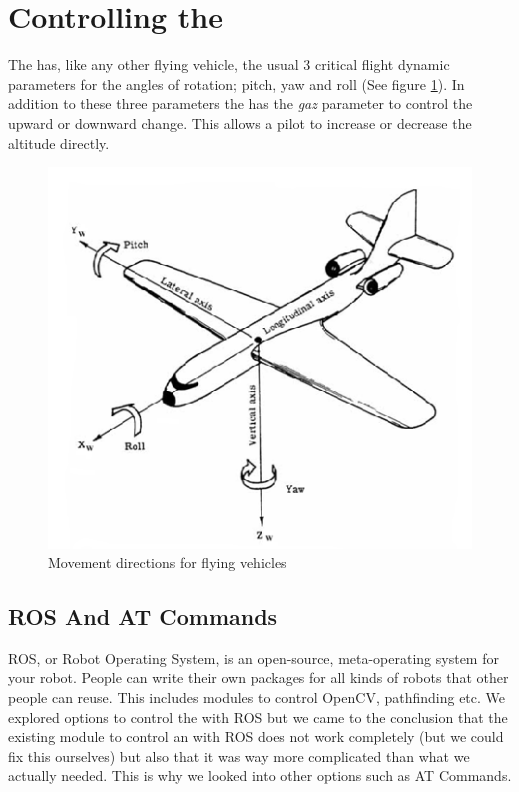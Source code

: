 \section{Controlling the \Ardrone}
The \Ardrone has, like any other flying vehicle, the usual 3 critical flight dynamic parameters for the angles of rotation; pitch, yaw and roll (See figure 
\ref{pitchYawRoll}). In addition to these three parameters the \Ardrone has the \textit{gaz} parameter to control the upward or downward change. This allows
a pilot to increase or decrease the altitude directly. 

\begin{figure}[h!]
    \centering
        \includegraphics[scale=0.5]{pitchYawRoll.png}
    \caption{Movement directions for flying vehicles}
    \label{pitchYawRoll}
\end{figure}

\subsection{ROS And AT Commands}
ROS, or Robot Operating System, is an open-source, meta-operating system for your robot. People can write their own packages for all kinds of robots that other people
can reuse. This includes modules to control OpenCV, pathfinding etc. We explored options to control the \Ardrone with ROS but we came to the conclusion that the existing
module to control an \Ardrone with ROS does not work completely (but we could fix this ourselves) but also that it was way more complicated than what we actually needed. 
This is why we looked into other options such as AT Commands. \\

